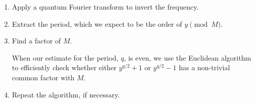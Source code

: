 \documentclass{article}
\def\ket#1{|{#1}\rangle}
\begin{document}
\begin{itemize}
\begin{enumerate}
\item Apply a quantum Fourier transform to invert the frequency.


\item Extract the period, which we expect to be the order of $y\pmod M$.


\item Find a factor of $M$.

When our estimate for the period, $q$, is even, we use the 
Euclidean algorithm
to efficiently check whether either $y^{q/2}+1$ or $y^{q/2}-1$ has 
a non-trivial common factor with $M$.

\item Repeat the algorithm, if necessary.

\end{enumerate}


\end{itemize}
\end{document}
